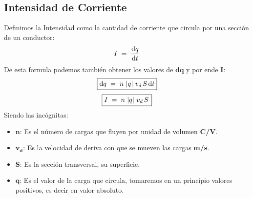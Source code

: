 
\subsection{Intensidad de Corriente}
\begin{wrapfigure}{r}{3cm}
\end{wrapfigure}
\noindent Definimos la Intensidad como la cantidad de corriente que circula por una sección de un conductor:
\[
        I \hspace{1mm}= \hspace{1mm} \frac{\mathrm{d}q }{\mathrm{d} t}
\]
\noindent De esta formula podemos también obtener los valores de \(\mathbf{d}\bm{q}\) y por ende \textbf{I}:
\[
        \boxed{\mathrm{d}q \hspace{1mm}= \hspace{1mm} n\hspace{.5mm}\left | q\right |\hspace{.5mm}v_d\hspace{.5mm}S\hspace{.5mm}\mathrm{d}t}
\]
\[
        \boxed{I \hspace{1mm}= \hspace{1mm} n\hspace{.5mm}\left | q\right |\hspace{.5mm}v_d\hspace{.5mm}S\hspace{.5mm}}
\]
Siendo las incógnitas:
\begin{itemize}
        \item \(\bm{n}\): Es el número de cargas que fluyen por unidad de volumen \textbf{C/V}.
        \item \(\bm{v_d}\): Es la velocidad de deriva con que se mueven las cargas \textbf{m/s}.
        \item \(\bm{S}\): Es la sección transversal, su superficie.
        \item \(\bm{q}\): Es el valor de la carga que circula, tomaremos en un principio valores positivos, es decir en valor absoluto.
\end{itemize}
